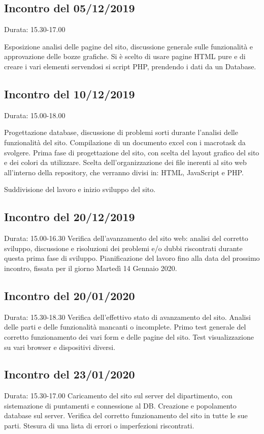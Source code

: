 \subsection{Incontro del 05/12/2019}
    Durata: 15.30-17.00

    Esposizione analisi delle pagine del sito, discussione generale sulle funzionalità e approvazione delle bozze grafiche.
    Si è scelto di usare pagine HTML pure e di creare i vari elementi servendosi si script PHP, prendendo i dati da un Database.

\subsection{Incontro del 10/12/2019}
    Durata: 15.00-18.00

    Progettazione database, discussione di problemi sorti durante l'analisi delle funzionalità del sito. Compilazione di un documento excel con i macrotask da svolgere.
    Prima fase di progettazione del sito, con scelta del layout grafico del sito e dei colori da utilizzare.
    Scelta dell'organizzazione dei file inerenti al sito web all'interno della repository, che verranno divisi in: HTML, JavaScript e PHP.

    Suddivisione del lavoro e inizio sviluppo del sito.

\subsection{Incontro del 20/12/2019}
    Durata: 15.00-16.30
    Verifica dell'avanzamento del sito web: analisi del corretto sviluppo, discussione e risoluzioni dei problemi e/o dubbi riscontrati durante questa prima fase di sviluppo.
    Pianificazione del lavoro fino alla data del prossimo incontro, fissata per il giorno Martedì 14 Gennaio 2020.

\subsection{Incontro del 20/01/2020}
    Durata: 15.30-18.30
    Verifica dell'effettivo stato di avanzamento del sito. Analisi delle parti e delle funzionalità mancanti o incomplete.
    Primo test generale del corretto funzionamento dei vari form e delle pagine del sito.
    Test visualizzazione su vari browser e dispositivi diversi.

\subsection{Incontro del 23/01/2020}
    Durata: 15.30-17.00
    Caricamento del sito sul server del dipartimento, con sistemazione di puntamenti e connessione al DB. Creazione e popolamento database sul server.
    Verifica del corretto funzionamento del sito in tutte le sue parti. Stesura di una lista di errori o imperfezioni riscontrati.

\pagebreak